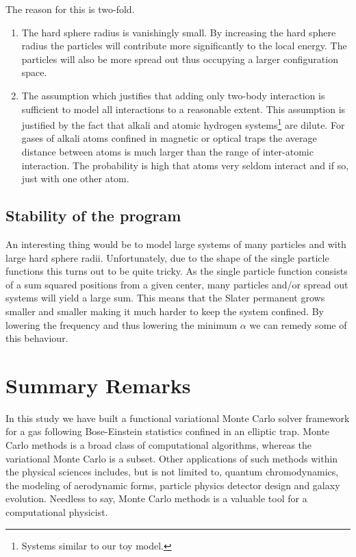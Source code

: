 \documentclass[
    a4paper, aps, twocolumn, floatfix, superscriptaddress,
    nofootinbib]{revtex4-1}
\newcommand{\1}{\mathds{1}}
\begin{document}
        The reason for this is two-fold.
        \begin{enumerate}
            \item The hard sphere radius is vanishingly small. By increasing the
                hard sphere radius the particles will contribute more
                significantly to the local energy. The particles will also be
                more spread out thus occupying a larger configuration space.

            \item The assumption which justifies that adding only two-body
                interaction is sufficient to model all interactions to a
                reasonable extent. This assumption is justified by the fact that
                alkali and atomic hydrogen systems\footnote{Systems similar to
                our toy model.} are dilute. For gases of alkali atoms confined
                in magnetic or optical traps the average distance between atoms
                is much larger than the range of inter-atomic interaction. The
                probability is high that atoms very seldom interact and if so,
                just with one other atom.
        \end{enumerate}

    \subsection{Stability of the program}
        An interesting thing would be to model large systems of many particles
        and with large hard sphere radii. Unfortunately, due to the shape of the
        single particle functions this turns out to be quite tricky. As the
        single particle function consists of a sum squared positions from a
        given center, many particles and/or spread out systems will yield a
        large sum. This means that the Slater permanent grows smaller and
        smaller making it much harder to keep the system confined. By lowering
        the frequency and thus lowering the minimum $\alpha$ we can remedy some
        of this behaviour.

\section{Summary Remarks}

    In this study we have built a functional variational Monte Carlo solver
    framework for a gas following Bose-Einstein statistics confined in an
    elliptic trap. Monte Carlo methods is a broad class of computational
    algorithms, whereas the variational Monte Carlo is a subset. Other
    applications of such methods within the physical sciences includes, but is
    not limited to, quantum chromodynamics, the modeling of aerodynamic forms,
    particle physics detector design and galaxy evolution.  Needless to say,
    Monte Carlo methods is a valuable tool for a computational physicist.
\end{document}
